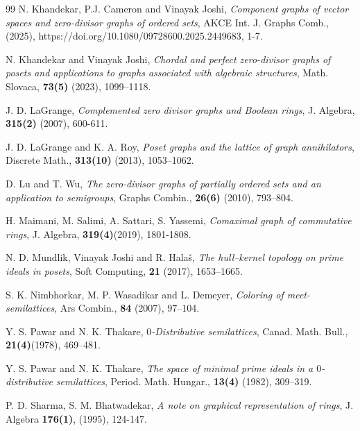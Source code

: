 \documentclass[10pt,one side,emlines]{amsart}
\theoremstyle{definition}
\begin{document}
\begin{thebibliography}{99}
	 N. Khandekar, P.J. Cameron and Vinayak Joshi, \textit{Component graphs of vector spaces and zero-divisor graphs of ordered sets}, AKCE Int. J. Graphs Comb.,(2025), https://doi.org/10.1080/09728600.2025.2449683, 1-7.
	
	  N. Khandekar and Vinayak Joshi, {\it Chordal and perfect zero-divisor graphs of posets and applications to graphs associated with algebraic structures}, Math. Slovaca, {\bf 73(5)} (2023), 1099–1118.	
	
		J. D. LaGrange, {\it Complemented zero divisor graphs and Boolean	rings}, J. Algebra, {\bf 315(2)} (2007), 600-611.
	
	  J. D. LaGrange and K. A. Roy, {\it  Poset graphs and the lattice of graph annihilators}, Discrete Math., {\bf 313(10)} (2013), 1053–1062.
	
	 D.	Lu and T. Wu,  {\it The zero-divisor graphs of partially ordered sets and an application to semigroups}, Graphs Combin., {\bf 26(6)} (2010), 793–804.
	
	 H. Maimani, M. Salimi, A. Sattari, S. Yassemi, {\it Comaximal graph of commutative rings}, J. Algebra, \textbf{319(4)}(2019), 1801-1808.
	
	 N. D. Mundlik, Vinayak Joshi and R. Hala\v{s}, {\it The hull–kernel topology on prime ideals in	posets}, Soft Computing, {\bf 21} (2017), 1653–1665.
	
	 S. K. Nimbhorkar, M. P. Wasadikar and L. Demeyer, {\it  Coloring of meet-semilattices}, Ars Combin., {\bf 84} (2007), 97–104.
	
	
	
	 Y. S. Pawar and N. K. Thakare,  {\it $0$-Distributive semilattices}, Canad. Math. Bull., {\bf 21(4)}(1978), 469–481.
	
		Y. S. Pawar and N. K. Thakare, {\it The space of minimal prime ideals in a $0$-distributive semilattices}, Period. Math. Hungar., {\bf 13(4)} (1982), 309–319.
	
	 P. D. Sharma, S. M. Bhatwadekar, {\it A note on graphical representation of rings}, J. Algebra {\bf 176(1)}, (1995), 124-147.
	

\end{thebibliography}
\end{document}

